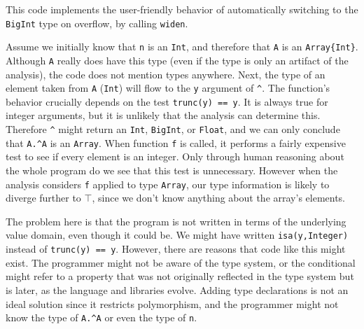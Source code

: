 \noindent
This code implements the user-friendly behavior of automatically switching to the
\texttt{BigInt} type on overflow, by calling \texttt{widen}.

Assume we initially know that \texttt{n} is an \texttt{Int}, and therefore
that \texttt{A} is an \texttt{Array\{Int\}}.
Although \texttt{A} really does have this type (even if the
type is only an artifact of the analysis), the code does not mention
types anywhere.
Next, the type of an element taken from \texttt{A} (\texttt{Int}) will
flow to the \texttt{y} argument of \texttt{\^}.
The function's behavior crucially depends on the test \texttt{trunc(y) == y}.
It is always true for integer arguments, but it is unlikely that the
analysis can determine this.
Therefore \texttt{\^} might return an \texttt{Int}, \texttt{BigInt}, or
\texttt{Float}, and we can only conclude that \texttt{A.\^{}A} is an
\texttt{Array}.
When function \texttt{f} is called, it performs a fairly expensive test
to see if every element is an integer.
Only through human reasoning about the whole program do we see that
this test is unnecessary.
However when the analysis considers \texttt{f} applied to type
\texttt{Array}, our type information is likely to diverge further to
\texttt{$\top$}, since we don't know anything about the array's elements.

The problem here is that the program is not written in terms of the
underlying value domain, even though it could be.
We might have written \texttt{isa(y,Integer)} instead of \texttt{trunc(y) == y}.
However, there are reasons that code like this might exist.
The programmer might not be aware of the type system, or the conditional
might refer to a property that was not originally reflected in the type system
but is later, as the language and libraries evolve.
Adding type declarations is not an ideal solution since it restricts
polymorphism, and the programmer might not know the type of \texttt{A.\^{}A}
or even the type of \texttt{n}.


\iffalse
How can we fix this?
One solution is to add type annotations.
But the author of the original code does not know the type of
\texttt{A.\^{}A}, and might not even know the type of \texttt{n}.
Another solution is to improve the analysis.
But we will never finish adding cases to the compiler.
Perhaps we can handle \texttt{trunc(y) == y}, but will we also be
able to understand \texttt{trunc(y) == 1*y}?
\fi

